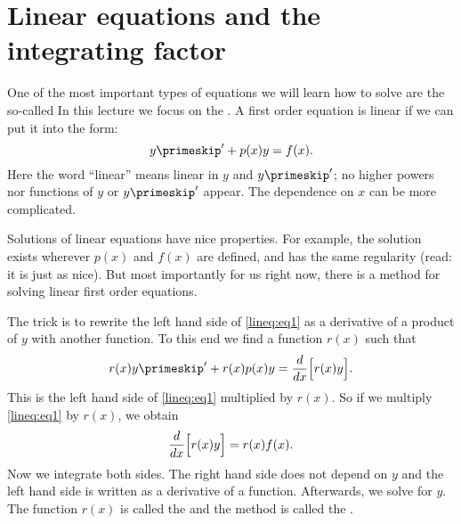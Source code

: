 \section{Linear equations and the integrating factor}\label{sec:lineareq}



One of the most important types of equations we will learn how to solve are
the so-called
In this lecture we focus on the
.
A first order equation is linear if we can put it
into the form:
\begin{equation} \label{lineq:eq1}
y\primeskip ' + p(x) y = f(x) .
\end{equation}
Here the word
``linear'' means linear in $y$ and $y\primeskip '$;
no higher powers nor functions of $y$ or $y\primeskip '$ appear.
The dependence on $x$ can be more
complicated.

Solutions of linear equations have nice properties.  For example, the
solution exists wherever $p(x)$ and $f(x)$ are defined, and has the same
regularity (read: it is just as nice).  But most importantly for us right now,
there is a method for solving linear first order equations.

The trick is to rewrite the left hand side
of \eqref{lineq:eq1} as a derivative of a product of $y$ with another
function.
To this end
we find a function $r(x)$ such that
\begin{equation*}
r(x) y\primeskip ' + r(x) p(x) y = \frac{d}{dx}\Bigl[ r(x) y \Bigr] .
\end{equation*}
This is the left hand side of
\eqref{lineq:eq1} multiplied by $r(x)$.  So if we multiply \eqref{lineq:eq1} by
$r(x)$, we obtain
\begin{equation*}
\frac{d}{dx}\Bigl[ r(x) y \Bigr] = r(x)f(x) .
\end{equation*}
Now we integrate both sides.
The right hand side does not depend on $y$ and the left hand side
is written as a derivative of a function.  Afterwards, we solve for $y$.
The function $r(x)$ is called the  and the
method is called the .


